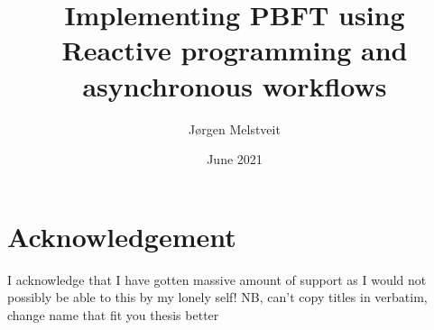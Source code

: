\documentclass[12pt, a4paper]{report}
\numberwithin{figure}{section}
\numberwithin{table}{section}
\begin{document}
	\hspace*{-7mm}
	\vspace*{-15mm}
	\thispagestyle{empty}
	\newpage

	
	
	\title{Implementing PBFT using Reactive programming and asynchronous workflows}
	\author{Jørgen Melstveit}
	\date{June 2021}
	\maketitle
	\tableofcontents
	\newpage

	\section*{Acknowledgement}
	I acknowledge that I have gotten massive amount of support as I would not possibly be able to this by my lonely self! 	
	NB, can't copy titles in verbatim, change name that fit you thesis better
	\newpage		
	
\end{document}
